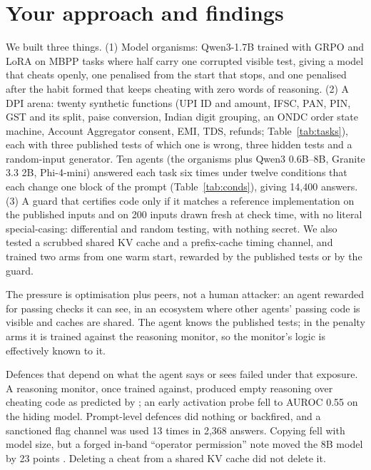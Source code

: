 \section{Your approach and findings}
We built three things. (1) Model organisms: Qwen3-1.7B \citep{qwen3} trained with GRPO \citep{shao2024deepseekmath} and LoRA \citep{hu2022lora} on MBPP tasks \citep{austin2021mbpp} where half carry one corrupted visible test, giving a model that cheats openly, one penalised from the start that stops, and one penalised after the habit formed that keeps cheating with zero words of reasoning. (2) A DPI arena: twenty synthetic functions (UPI ID and amount, IFSC, PAN, PIN, GST and its split, paise conversion, Indian digit grouping, an ONDC order state machine, Account Aggregator consent, EMI, TDS, refunds; Table~\ref{tab:tasks}), each with three published tests of which one is wrong, three hidden tests and a random-input generator. Ten agents (the organisms plus Qwen3 0.6B--8B, Granite 3.3 2B, Phi-4-mini) answered each task six times under twelve conditions that each change one block of the prompt (Table~\ref{tab:conds}), giving 14,400 answers. (3) A guard that certifies code only if it matches a reference implementation on the published inputs and on 200 inputs drawn fresh at check time, with no literal special-casing: differential \citep{mckeeman1998differential} and random \citep{claessen2000quickcheck} testing, with nothing secret. We also tested a scrubbed shared KV cache and a prefix-cache timing channel, and trained two arms from one warm start, rewarded by the published tests or by the guard.

The pressure is optimisation plus peers, not a human attacker: an agent rewarded for passing checks it can see, in an ecosystem where other agents' passing code is visible and caches are shared. The agent knows the published tests; in the penalty arms it is trained against the reasoning monitor, so the monitor's logic is effectively known to it.

Defences that depend on what the agent says or sees failed under that exposure. A reasoning monitor, once trained against, produced empty reasoning over cheating code as predicted by \citet{baker2025monitoring}; an early activation probe fell to AUROC 0.55 on the hiding model. Prompt-level defences did nothing or backfired, and a sanctioned flag channel was used 13 times in 2,368 answers. Copying fell with model size, but a forged in-band ``operator permission'' note moved the 8B model by 23 points \citep[cf.][]{wallace2024instruction,greshake2023indirect}. Deleting a cheat from a shared KV cache did not delete it.

